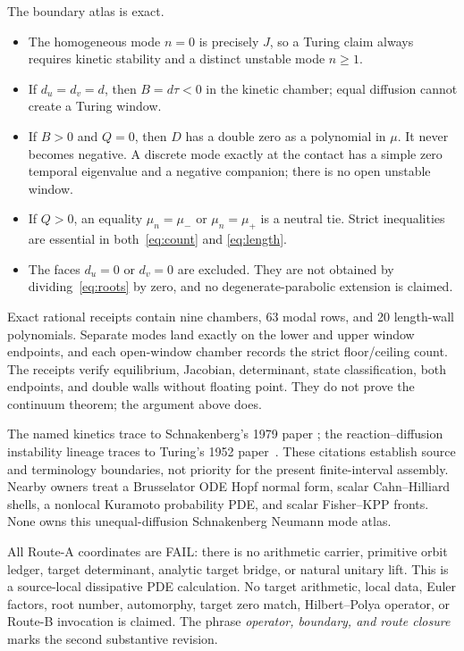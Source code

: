 \documentclass[10pt]{article}
\begin{document}
The boundary atlas is exact.
\begin{itemize}
\item The homogeneous mode $n=0$ is precisely $J$, so a Turing claim always
requires kinetic stability and a distinct unstable mode $n\geq1$.
\item If $d_u=d_v=d$, then $B=d\tau<0$ in the kinetic chamber; equal
diffusion cannot create a Turing window.
\item If $B>0$ and $Q=0$, then $D$ has a double zero as a polynomial in
$\mu$.  It never becomes negative.  A discrete mode exactly at the contact
has a simple zero temporal eigenvalue and a negative companion; there is no
open unstable window.
\item If $Q>0$, an equality $\mu_n=\mu_-$ or $\mu_n=\mu_+$ is a neutral
tie.  Strict inequalities are essential in both~\eqref{eq:count} and
\eqref{eq:length}.
\item The faces $d_u=0$ or $d_v=0$ are excluded.  They are not obtained by
dividing~\eqref{eq:roots} by zero, and no degenerate-parabolic extension is
claimed.
\end{itemize}

Exact rational receipts contain nine chambers, 63 modal rows, and 20
length-wall polynomials.  Separate modes land exactly on the lower and upper
window endpoints, and each open-window chamber records the strict
floor/ceiling count.  The receipts verify equilibrium, Jacobian, determinant,
state classification, both endpoints, and double walls without floating
point.  They do not prove the continuum theorem; the argument above does.

The named kinetics trace to Schnakenberg's 1979 paper
\cite{schnakenberg1979}; the reaction--diffusion instability lineage traces
to Turing's 1952 paper~\cite{turing1952}.  These citations establish source
and terminology boundaries, not priority for the present finite-interval
assembly.  Nearby owners treat a Brusselator ODE Hopf normal form, scalar
Cahn--Hilliard shells, a nonlocal Kuramoto probability PDE, and scalar
Fisher--KPP fronts.  None owns this unequal-diffusion Schnakenberg Neumann
mode atlas.

All Route-A coordinates are FAIL: there is no arithmetic carrier, primitive
orbit ledger, target determinant, analytic target bridge, or natural unitary
lift.  This is a source-local dissipative PDE calculation.  No target
arithmetic, local data, Euler factors, root number, automorphy, target zero
match, Hilbert--Polya operator, or Route-B invocation is claimed.  The phrase
\emph{operator, boundary, and route closure} marks the second substantive
revision.
\end{document}
